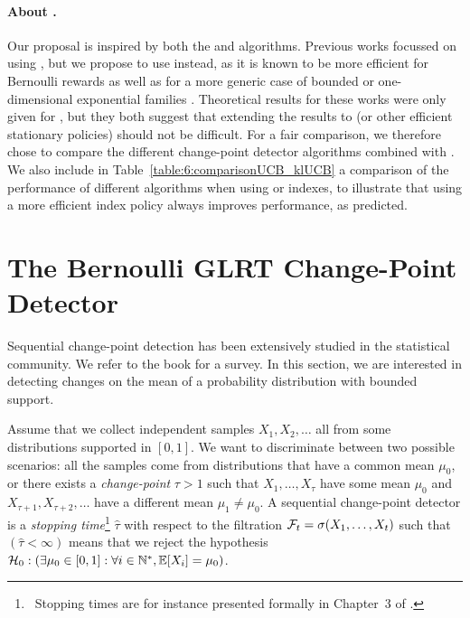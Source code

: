 \paragraph{About \klUCB.}
%
Our proposal \GLRklUCB{} is inspired by both the \MUCB{} and \CUSUMUCB{} algorithms.
Previous works focussed on using \UCB{} \cite{LiuLeeShroff17,CaoZhenKvetonXie18},
but we propose to use \klUCB{} instead, as it is known to be more efficient for Bernoulli rewards as well as for a more generic case of bounded or one-dimensional exponential families \cite{KLUCBJournal}.
Theoretical results for these works were only given for \UCB, but they both suggest that extending the results to \klUCB{} (or other efficient stationary policies) should not be difficult.
For a fair comparison, we therefore chose to compare the different change-point detector algorithms combined with \klUCB.
We also include in Table~\ref{table:6:comparisonUCB_klUCB} a comparison of the performance of different algorithms when using \UCB{} or \klUCB{} indexes, to illustrate that using a more efficient index policy always improves performance, as predicted.


\section{The Bernoulli GLRT Change-Point Detector}
\label{sec:6:ChangePointDetector}

Sequential change-point detection has been extensively studied in the statistical community.
We refer to the book \cite{Basseville93} for a survey.
%
In this section, we are interested in detecting changes on the mean of a probability distribution with bounded support.

Assume that we collect independent samples $X_1,X_2,\ldots$ all from some distributions supported in $[0,1]$.
We want to discriminate between two possible scenarios: all the samples come from distributions that have a common mean $\mu_0$, or there exists a \emph{change-point} $\tau > 1$ such that $X_1,\ldots,X_\tau$ have some mean $\mu_0$ and $X_{\tau +1},X_{\tau+2},\ldots$ have a different mean $\mu_1 \neq \mu_0$.
%
A sequential change-point detector is a \emph{stopping time}\footnote{~Stopping times are for instance presented formally in Chapter~3 of \cite{LattimoreBanditAlgorithmsBook}.} $\widehat{\tau}$ with respect to the filtration $\mathcal{F}_t = \sigma(X_1,\dots,X_t)$ such that $(\hat \tau < \infty)$ means that we reject the hypothesis
$\mathcal{H}_0 : \left(\exists \mu_0 \in [0,1]: \forall i\in\mathbb{N}^*, \mathbb{E}[X_i] = \mu_0\right)$.

